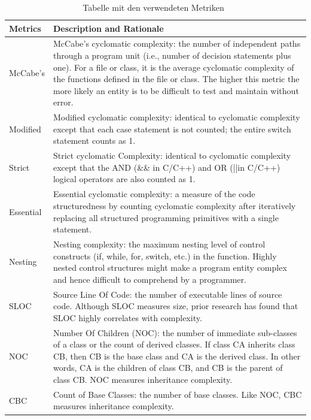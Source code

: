 \begin{table}
	\caption{Tabelle mit den verwendeten Metriken~\cite{chowdhury_zulkernine_2010}}
	\label{table1}
	\begin{tabular}{|p{1.6cm}|p{10.4cm}|}
		\hline
		\textbf{Metrics} & \textbf{Description and Rationale} \\
		\hline
		McCabe's & McCabe's cyclomatic complexity: the number of independent paths through a program unit (i.e., number of decision statements plus one).
		For a file or class, it is the average cyclomatic complexity of the functions defined in the file or class. The higher this metric the more likely
		an entity is to be difficult to test and maintain without error.\\
		\hline
		Modified & Modified cyclomatic complexity: identical to cyclomatic complexity except that each case statement is not counted; the entire switch statement counts as 1.\\
		\hline
		Strict & Strict cyclomatic Complexity: identical to cyclomatic complexity except that the AND (\&\& in C/C++) and OR (||in C/C++) logical operators are also counted as 1.\\
		\hline
		Essential & Essential cyclomatic complexity: a measure of the code structuredness by counting cyclomatic complexity after iteratively replacing all structured programming primitives with a single statement.\\
		\hline
		Nesting & Nesting complexity: the maximum nesting level of control constructs (if, while, for, switch, etc.) in the function. Highly nested control	structures might make a program entity complex and hence difficult to comprehend by a programmer.\\
		\hline
		SLOC & Source Line Of Code: the number of executable lines of source code. Although SLOC measures size, prior research has found that SLOC highly correlates with complexity.\\
		\hline
		NOC & Number Of Children (NOC): the number of immediate sub-classes of a class or the count of derived classes. If class CA inherits class CB, then	CB is the base class and CA is the derived class. In other words, CA is the children of class CB, and CB is the parent of class CB. NOC measures inheritance complexity.\\
		\hline
		CBC & Count of Base Classes: the number of base classes. Like NOC, CBC measures inheritance complexity.\\
		\hline
	\end{tabular}
\end{table}

